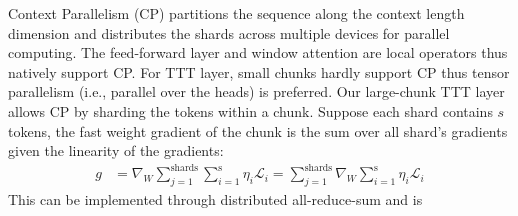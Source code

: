 Context Parallelism (CP) partitions the sequence along the context length dimension and distributes the shards across multiple devices for parallel computing.
The feed-forward layer and window attention are local operators thus natively support CP.
For TTT layer, small chunks hardly support CP thus tensor parallelism (i.e., parallel over the heads) is preferred.
Our large-chunk TTT layer allows CP by sharding the tokens within a chunk.
Suppose each shard contains $s$ tokens,
the fast weight gradient of the chunk is the sum over all shard's gradients given the linearity of the gradients:
\begin{align}
g &=  \nabla_{W}  \sum_{j=1}^{\text{shards}} \sum_{i=1}^{\text{s}} \eta_i \mathcal{L}_i  = \sum_{j=1}^{\text{shards}} \nabla_{W}   \sum_{i=1}^{\text{s}} \eta_i \mathcal{L}_i
\label{eq:context_parallelism}
\end{align}
This can be implemented through distributed all-reduce-sum and is 
